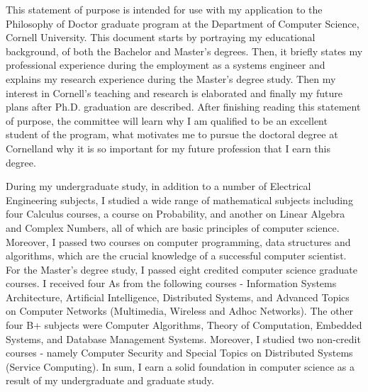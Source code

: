 \documentclass[a4paper,10pt]{report}
\newcommand{\university}{Cornell University}
\newcommand{\department}{Department of Computer Science}
\newcommand{\uniabbre}{Cornell}
\begin{document}

\vspace{0.4cm}
This statement of purpose is intended for use with my application to the Philosophy of Doctor graduate program at the \department, \university. This document starts by portraying my educational background, of both the Bachelor and Master's degrees. Then, it briefly states my professional experience during the employment as a systems engineer and explains my research experience during the Master's degree study. Then my interest in \uniabbre's teaching and research is elaborated and finally my future plans after Ph.D. graduation are described. After finishing reading this statement of purpose, the committee will learn why I am qualified to be an excellent student of the program, what motivates me to pursue the doctoral degree at \uniabbre \space and why it is so important for my future profession that I earn this degree.

\vspace{0.2cm}
During my undergraduate study, in addition to a number of Electrical Engineering subjects, I studied a wide range of mathematical subjects including four Calculus courses, a course on Probability, and another on Linear Algebra and Complex Numbers, all of which are basic principles of computer science. Moreover, I passed two courses on computer programming, data structures and algorithms, which are the crucial knowledge of a successful computer scientist. For the Master's degree study, I passed eight credited computer science graduate courses. I received four As from the following courses - Information Systems Architecture, Artificial Intelligence, Distributed Systems, and Advanced Topics on Computer Networks (Multimedia, Wireless and Adhoc Networks). The other four B+ subjects were Computer Algorithms, Theory of Computation, Embedded Systems, and Database Management Systems. Moreover, I studied two non-credit courses - namely Computer Security and Special Topics on Distributed Systems (Service Computing). In sum, I earn a solid foundation in computer science as a result of my undergraduate and graduate study. 
\end{document}
